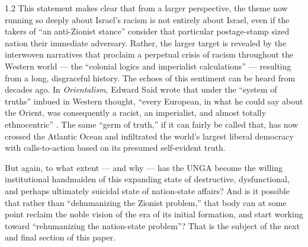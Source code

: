 \documentclass[../unravbook.tex]{subfiles}
\begin{document}
\begin{spacing}{1.2}
This statement makes clear that from a larger perspective, the theme now running so deeply about Israel's racism is not entirely about Israel, even if the takers of \enquote{an anti-Zionist stance} consider that particular postage-stamp sized nation their immediate adversary. Rather, the larger target is revealed by the interwoven narratives that proclaim a perpetual crisis of racism throughout the Western world --- the \enquote{colonial logics and imperialist calculations} ---  resulting from a long, disgraceful history. The echoes of this sentiment can be heard from decades ago. In \textit{Orientalism}, Edward Said wrote that under the ``system of truths'' imbued in Western thought, ``every European, in what he could say about the Orient, was consequently a racist, an imperialist, and almost totally ethnocentric'' \parencite[204]{Said-1978a}. The same \enquote{germ of truth,} if it can fairly be called that, has now crossed the Atlantic Ocean and infiltrated the world's largest liberal democracy with calls-to-action based on its presumed self-evident truth. 

But again, to what extent --- and why --- has the UNGA become the willing institutional handmaiden of this expanding state of destructive, dysfunctional, and perhaps ultimately suicidal state of nation-state affairs? And is it possible that rather than \enquote{dehumanizing the Zionist problem,} that body can at some point reclaim the noble vision of the era of its initial formation, and start working toward \enquote{rehumanizing the nation-state problem}? That is the subject of the next and final section of this paper.

\parindent 0pt
\parskip 6pt

\end{spacing}

{\footnotesize
\printendnotes[paragraph]}

\thispagestyle{empty} %
\end{document}
